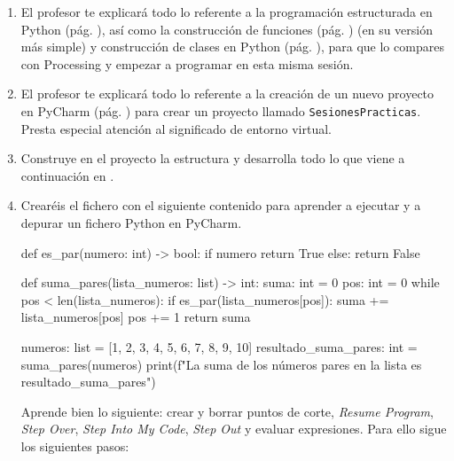 \begin{enumerate}%

\item 
El profesor te explicará todo lo referente a la programación estructurada en Python (pág. \pageref{subsec:ProgramacionEstructurada}), así como la construcción de funciones (pág. \pageref{subsec:ProgramacionProcedimental}) (en su versión más simple) y construcción de clases en Python (pág. \pageref{subsec:ClasesEnPython}), para que lo compares con Processing y empezar a programar en esta misma sesión. 

\item 
El profesor te explicará todo lo referente a la creación de un nuevo proyecto en PyCharm (pág. \pageref{subsec:SesionPyCharm}) para crear un proyecto llamado \texttt{SesionesPracticas}. Presta especial atención al significado de entorno virtual. 

\item Construye en el proyecto la  estructura  y desarrolla todo lo que viene a continuación en .


\item Crearéis el fichero  con el siguiente contenido para aprender a ejecutar y a depurar un fichero Python en PyCharm.

\begin{pyverbatim}[][frame=single, numbers=left, numbersep=2pt]
def es_par(numero: int) -> bool:
    if numero %
        return True
    else:
        return False


def suma_pares(lista_numeros: list) -> int:
    suma: int = 0
    pos: int = 0
    while pos < len(lista_numeros):
        if es_par(lista_numeros[pos]):
            suma += lista_numeros[pos]
        pos += 1
    return suma


numeros: list = [1, 2, 3, 4, 5, 6, 7, 8, 9, 10]
resultado_suma_pares: int = suma_pares(numeros)
print(f"La suma de los números pares en la lista es {resultado_suma_pares}")

\end{pyverbatim}

Aprende bien lo siguiente: crear y borrar puntos de corte, \textit{Resume Program}, \textit{Step Over}, \textit{Step Into My Code}, \textit{Step Out} y evaluar expresiones. Para ello sigue los siguientes pasos:


\end{enumerate}
